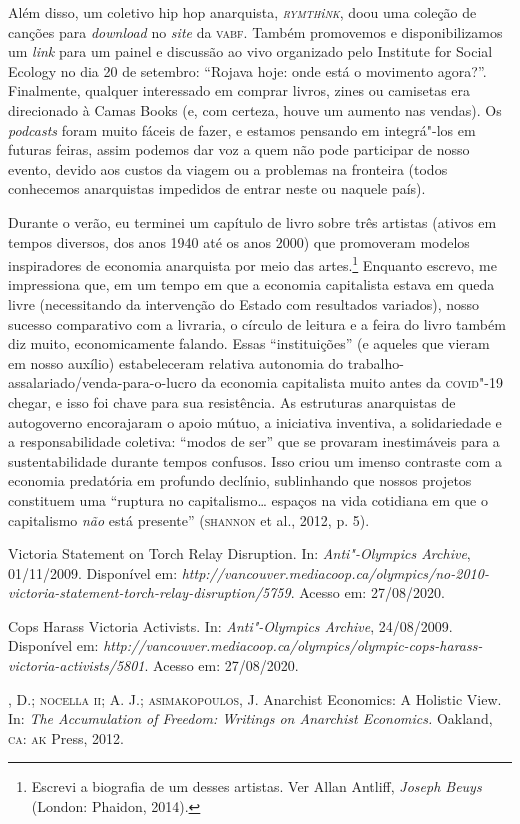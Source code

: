 Além disso, um coletivo hip hop anarquista, \emph{\textsc{rymth}i\textsc{nk}}, doou uma
coleção de canções para \emph{download} no \emph{site} da \textsc{vabf}. Também
promovemos e disponibilizamos um \emph{link} para um painel e discussão
ao vivo organizado pelo Institute for Social Ecology no dia 20 de
setembro: ``Rojava hoje: onde está o movimento agora?''. Finalmente,
qualquer interessado em comprar livros, zines ou camisetas era
direcionado à Camas Books (e, com certeza, houve um aumento nas vendas).
Os \emph{podcasts} foram muito fáceis de fazer, e estamos pensando em
integrá"-los em futuras feiras, assim podemos dar voz a quem não pode
participar de nosso evento, devido aos custos da viagem ou a problemas
na fronteira (todos conhecemos anarquistas impedidos de entrar neste ou
naquele país).

Durante o verão, eu terminei um capítulo de livro sobre três artistas
(ativos em tempos diversos, dos anos 1940 até os anos 2000) que
promoveram modelos inspiradores de economia anarquista por meio das
artes.\footnote{Escrevi a biografia de um desses artistas. Ver Allan
  Antliff, \emph{Joseph Beuys} (London: Phaidon, 2014).} Enquanto
escrevo, me impressiona que, em um tempo em que a economia capitalista
estava em queda livre (necessitando da intervenção do Estado com
resultados variados), nosso sucesso comparativo com a livraria, o
círculo de leitura e a feira do livro também diz muito, economicamente
falando. Essas ``instituições'' (e aqueles que vieram em nosso auxílio)
estabeleceram relativa autonomia do
trabalho-assalariado/venda-para-o-lucro da economia capitalista muito
antes da \textsc{covid}"-19 chegar, e isso foi chave para sua resistência. As
estruturas anarquistas de autogoverno encorajaram o apoio mútuo, a
iniciativa inventiva, a solidariedade e a responsabilidade coletiva:
``modos de ser'' que se provaram inestimáveis para a sustentabilidade
durante tempos confusos. Isso criou um imenso contraste com a economia
predatória em profundo declínio, sublinhando que nossos projetos
constituem uma ``ruptura no capitalismo\ldots{} espaços na vida cotidiana em
que o capitalismo \emph{não} está presente'' (\textsc{shannon} et al., 2012, p.
5).


\begin{bibliohedra}
 Victoria Statement on Torch Relay Disruption. In:
\emph{Anti"-Olympics Archive}, 01/11/2009. Disponível em:
\emph{http://vancouver.mediacoop.ca/olympics/no-2010-victoria-statement-torch-relay-disruption/5759}.
Acesso em: 27/08/2020.

 Cops Harass Victoria Activists. In: \emph{Anti"-Olympics
Archive}, 24/08/2009. Disponível em:
\emph{http://vancouver.mediacoop.ca/olympics/olympic-cops-harass-victoria-activists/5801}.
Acesso em: 27/08/2020.

, D.; \textsc{nocella ii}; A. J.; \textsc{asimakopoulos}, J. Anarchist Economics: A
Holistic View. In: \emph{The Accumulation of Freedom: Writings on
Anarchist Economics.} Oakland, \textsc{ca}: \textsc{ak} Press, 2012.
\end{bibliohedra}


